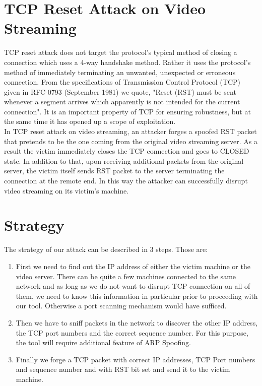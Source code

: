 \documentclass[14pt]{extarticle}
\begin{document}
\section{TCP Reset Attack on Video Streaming}
    TCP reset attack does not target the protocol's typical method of closing a connection which uses a 4-way handshake method. Rather it uses the protocol's method of immediately terminating an unwanted, unexpected or erroneous connection. From the specifications of Transmission Control Protocol (TCP) given in RFC-0793 (September 1981) we quote, "Reset (RST) must be sent whenever a segment arrives which apparently is not intended for the current connection". It is an important property of TCP for ensuring robustness, but at the same time it has opened up a scope of exploitation. \\ 
    In TCP reset attack on video streaming, an attacker forges a spoofed RST packet that pretends to be the one coming from the original video streaming server. As a result the victim immediately closes the TCP connection and goes to CLOSED state. In addition to that, upon receiving additional packets from the original server, the victim itself sends RST packet to the server terminating the connection at the remote end. In this way the attacker can successfully disrupt video streaming on its victim's machine.

\section{Strategy}
   
    The  strategy of our attack can be described in 3 steps. Those are:
    \begin{enumerate}
      \item First we need to find out the IP address of either the victim machine or the video server. There can be quite a few machines connected to the same network and as long as we do not want to disrupt TCP connection on all of them, we need to know this information in particular prior to proceeding with our tool. Otherwise a port scanning mechanism would have sufficed. 
      \item Then we have to sniff packets in the network to discover the other IP address, the TCP port numbers and the correct sequence number. For this purpose, the tool will require additional feature of ARP Spoofing.
      \item Finally we forge a TCP packet with correct IP addresses, TCP Port numbers and sequence number and with RST bit set and send it to the victim machine.
    \end{enumerate}
    
\end{document}

